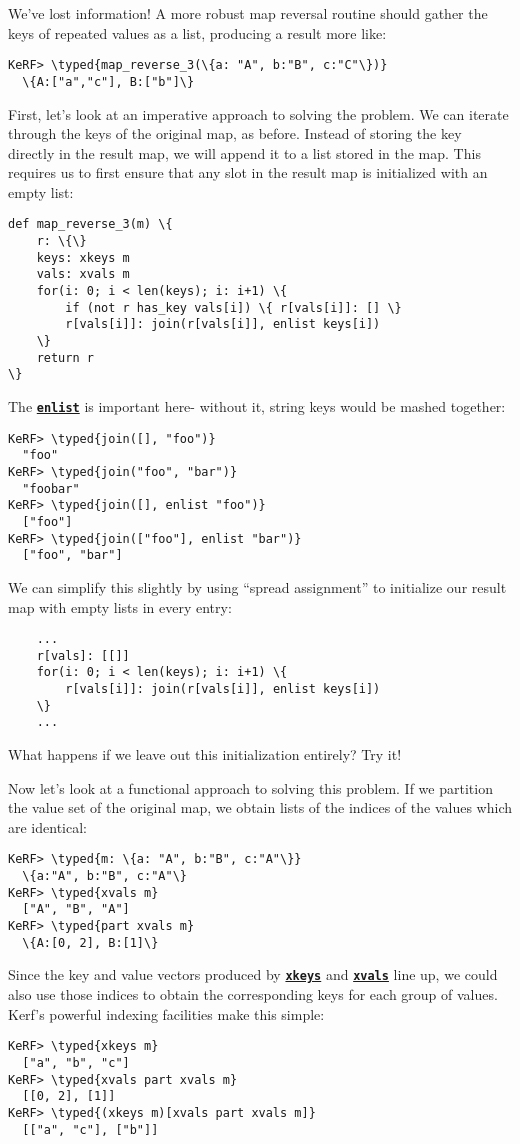 \documentclass{article}
\newcommand{\typed}[1]{\textcolor{TealBlue}{#1}}
\newcommand{\primu}[2]{\hyperref[prim:#2]{\textbf{\texttt{#1}}}}
\newcommand{\prim}[1]{\primu{#1}{#1}}
\begin{document}
We've lost information! A more robust map reversal routine should gather the keys of repeated values as a list, producing a result more like:

\begin{Verbatim}
KeRF> \typed{map_reverse_3(\{a: "A", b:"B", c:"C"\})}
  \{A:["a","c"], B:["b"]\}
\end{Verbatim}

First, let's look at an imperative approach to solving the problem. We can iterate through the keys of the original map, as before. Instead of storing the key directly in the result map, we will append it to a list stored in the map. This requires us to first ensure that any slot in the result map is initialized with an empty list:
\begin{Verbatim}
def map_reverse_3(m) \{
	r: \{\}
	keys: xkeys m
	vals: xvals m
	for(i: 0; i < len(keys); i: i+1) \{
		if (not r has_key vals[i]) \{ r[vals[i]]: [] \}
		r[vals[i]]: join(r[vals[i]], enlist keys[i])
	\}
	return r
\}
\end{Verbatim}

The \prim{enlist} is important here- without it, string keys would be mashed together:
\begin{Verbatim}
KeRF> \typed{join([], "foo")}
  "foo"
KeRF> \typed{join("foo", "bar")}
  "foobar"
KeRF> \typed{join([], enlist "foo")}
  ["foo"]
KeRF> \typed{join(["foo"], enlist "bar")}
  ["foo", "bar"]
\end{Verbatim}

We can simplify this slightly by using ``spread assignment'' to initialize our result map with empty lists in every entry:
\begin{Verbatim}
	...
	r[vals]: [[]]
	for(i: 0; i < len(keys); i: i+1) \{
		r[vals[i]]: join(r[vals[i]], enlist keys[i])
	\}
	...
\end{Verbatim}

What happens if we leave out this initialization entirely? Try it!

\pagebreak
Now let's look at a functional approach to solving this problem. If we partition the value set of the original map, we obtain lists of the indices of the values which are identical:
\begin{Verbatim}
KeRF> \typed{m: \{a: "A", b:"B", c:"A"\}}
  \{a:"A", b:"B", c:"A"\}
KeRF> \typed{xvals m}
  ["A", "B", "A"]
KeRF> \typed{part xvals m}
  \{A:[0, 2], B:[1]\}
\end{Verbatim}

Since the key and value vectors produced by \prim{xkeys} and \prim{xvals} line up, we could also use those indices to obtain the corresponding keys for each group of values. Kerf's powerful indexing facilities make this simple:
\begin{Verbatim}
KeRF> \typed{xkeys m}
  ["a", "b", "c"]
KeRF> \typed{xvals part xvals m}
  [[0, 2], [1]]
KeRF> \typed{(xkeys m)[xvals part xvals m]}
  [["a", "c"], ["b"]]
\end{Verbatim}
\end{document}
